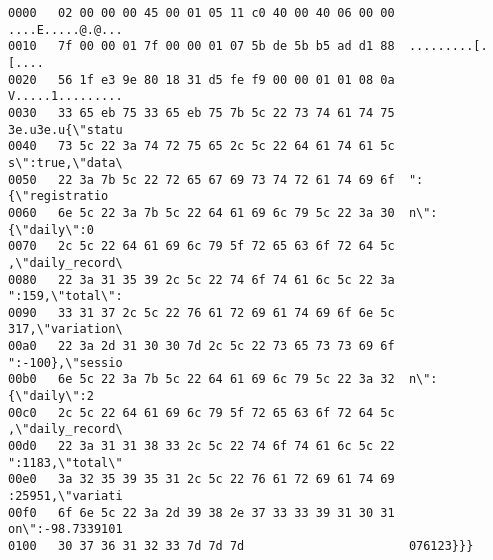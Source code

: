 \begin{lstlisting}[label={lst:packetRicezioneMqtt}, captionpos=b, caption={MQTT Payload dati inviato dal server}, basicstyle=\scriptsize\ttfamily]
0000   02 00 00 00 45 00 01 05 11 c0 40 00 40 06 00 00  ....E.....@.@...
0010   7f 00 00 01 7f 00 00 01 07 5b de 5b b5 ad d1 88  .........[.[....
0020   56 1f e3 9e 80 18 31 d5 fe f9 00 00 01 01 08 0a  V.....1.........
0030   33 65 eb 75 33 65 eb 75 7b 5c 22 73 74 61 74 75  3e.u3e.u{\"statu
0040   73 5c 22 3a 74 72 75 65 2c 5c 22 64 61 74 61 5c  s\":true,\"data\
0050   22 3a 7b 5c 22 72 65 67 69 73 74 72 61 74 69 6f  ":{\"registratio
0060   6e 5c 22 3a 7b 5c 22 64 61 69 6c 79 5c 22 3a 30  n\":{\"daily\":0
0070   2c 5c 22 64 61 69 6c 79 5f 72 65 63 6f 72 64 5c  ,\"daily_record\
0080   22 3a 31 35 39 2c 5c 22 74 6f 74 61 6c 5c 22 3a  ":159,\"total\":
0090   33 31 37 2c 5c 22 76 61 72 69 61 74 69 6f 6e 5c  317,\"variation\
00a0   22 3a 2d 31 30 30 7d 2c 5c 22 73 65 73 73 69 6f  ":-100},\"sessio
00b0   6e 5c 22 3a 7b 5c 22 64 61 69 6c 79 5c 22 3a 32  n\":{\"daily\":2
00c0   2c 5c 22 64 61 69 6c 79 5f 72 65 63 6f 72 64 5c  ,\"daily_record\
00d0   22 3a 31 31 38 33 2c 5c 22 74 6f 74 61 6c 5c 22  ":1183,\"total\"
00e0   3a 32 35 39 35 31 2c 5c 22 76 61 72 69 61 74 69  :25951,\"variati
00f0   6f 6e 5c 22 3a 2d 39 38 2e 37 33 33 39 31 30 31  on\":-98.7339101
0100   30 37 36 31 32 33 7d 7d 7d                       076123}}}
\end{lstlisting}
